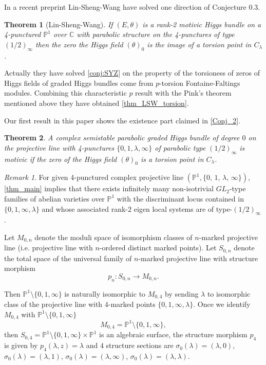\documentclass[12pt,twoside]{book}
\theoremstyle{plain}
\newtheorem{theorem}{Theorem}[section]
\theoremstyle{definition}
\theoremstyle{remark}
\newtheorem{remark}[remark]{Remark}
\newcommand{\bP}{{\mathbb P}}
\numberwithin{equation}{section}
\begin{document}
In a recent preprint \cite{LSW22} Lin-Sheng-Wang have solved one direction of Conjecture 0.3.
\begin{theorem}[Lin-Sheng-Wang] \label{thm_LSW_torsion}
If $(E,\theta)$ is a rank-2 motivic Higgs bundle on a 4-punctured $\mathbb P^1$ over $\mathbb C$ with parabolic structure on the 4-punctures of type $(1/2)_\infty$ then the zero the Higgs field $(\theta)_0$ is the image of a torsion point in $C_\lambda$.
\end{theorem}
Actually they have solved \autoref{conj:SYZ} on the property of  the torsioness of zeros of Higgs fields of graded Higgs bundles come  from $p$-torsion Fontaine-Faltings modules. Combining this characteristic $p$ result with the Pink's theorem mentioned above they have obtained \autoref{thm_LSW_torsion}.

Our first result in this paper shows the existence part claimed in \autoref{Conj_2}.
\begin{theorem}\label{thm_main}
A complex semistable parabolic graded Higgs bundle  of degree $0$ on the projective line with 4-punctures $\{0,1,\lambda,\infty\}$
of parabolic type $(1/2)_\infty$ is motivic if the zero of the Higgs field $(\theta)_0$ is a torsion point in $C_\lambda$.
\end{theorem}

\begin{remark} For given 4-punctured complex projective line $(\mathbb P^1, \{ 0,\, 1,\, \lambda,\, \infty\})$, \autoref{thm_main} implies that there exists infinitely many non-isotrivial $GL_2$-type families of abelian varieties over $\bP^1$ with the discriminant locus contained in $\{0,1,\infty,\lambda\}$ and whose associated rank-$2$ eigen local systems are of type-$(1/2)_\infty$.
\end{remark}

Let $M_{0,n}$ denote the moduli space of isomorphism classes of $n$-marked projective line (i.e. projective line with $n$-ordered distinct marked points). Let $S_{0,n}$ denote the total space of the universal family of $n$-marked projective line with structure morphism
\[p_n\colon S_{0,n}\rightarrow M_{0,n}.\]

Then $\bP^1\setminus\{0,1,\infty\}$ is naturally isomorphic to $M_{0,4}$ by sending $\lambda$ to isomorphic class of the projective line with $4$-marked points $\{0,1,\infty,\lambda\}$. Once we identify $M_{0,4}$ with $\bP^1\setminus\{0,1,\infty\}$
\[M_{0,4} = \bP^1\setminus\{0,1,\infty\},\]
then $S_{0,4}= \bP^1\setminus\{0,1,\infty\} \times \bP^1$ is an algebraic surface, the structure morphism $p_4$ is given by $p_4(\lambda,z)=\lambda$ and $4$ structure sections are $\sigma_0(\lambda)=(\lambda,0)$, $\sigma_0(\lambda)=(\lambda,1)$, $\sigma_0(\lambda)=(\lambda,\infty)$, $\sigma_0(\lambda)=(\lambda,\lambda)$.
\end{document}
